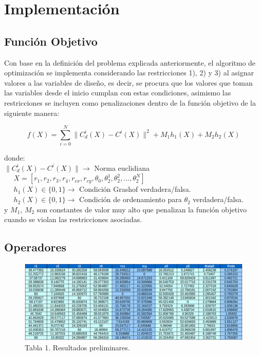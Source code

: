 \documentclass[10pt,journal,compsoc]{styles/IEEEtran}
\begin{document}
\section{Implementaci\'on}

\subsection{Funci\'on Objetivo}
Con base en la definici\'on del problema explicada anteriormente, el algoritmo de optimizaci\'on se implementa considerando las restricciones 1), 2) y 3) al asignar valores a las variables de dise\~no, es decir, se procura que los valores que toman las variables desde el inicio cumplan con estas condiciones, asimismo las restricciones se incluyen como penalizaciones dentro de la funci\'on objetivo de la siguiente manera:

$$f(X)=\sum\limits_{i=0}^N \parallel C_{d}^i(X)-C^i(X) \parallel^2+M_1 h_1 (X) + M_2 h_2 (X)$$

donde: \vspace{0.05cm}\\

$\parallel C_{d}^i(X)-C^i(X) \parallel \rightarrow$ Norma euclidiana\\
$~~~~~~X=[r_1,r_2,r_3,r_4,r_{cx},r_{cy},\theta_0,\theta_2^1,\theta_2^2,...,\theta_2^N]$\\
$~~~~~~h_1(X) \in \{0,1\} \rightarrow$ Condici\'on Grashof verdadera/falsa.\\
$~~~~~~h_2(X) \in \{0,1\} \rightarrow$ Condici\'on de ordenamiento para $\theta_2$ verdadera/falsa.\\

y $M_1$, $M_2$ son constantes de valor muy alto que penalizan la funci\'on objetivo cuando se violan las restricciones asociadas.\\

\subsection{Operadores}

   \begin{figure}[ht]
    \center
    \includegraphics[width = 1.0\textwidth]{tabla.png}
    \caption{Tabla 1. Resultados preliminares.}
  \end{figure}
\end{document}
